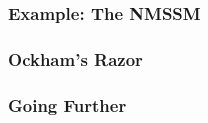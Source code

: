 \documentclass[10pt,aspectratio=169]{beamer}
\begin{document}
\begin{frame}
  \frametitle{Example: The NMSSM}
\end{frame}

\begin{frame}
  \frametitle{Ockham's Razor}
\end{frame}

\begin{frame}
  \frametitle{Going Further}
\end{frame}
\end{document}
